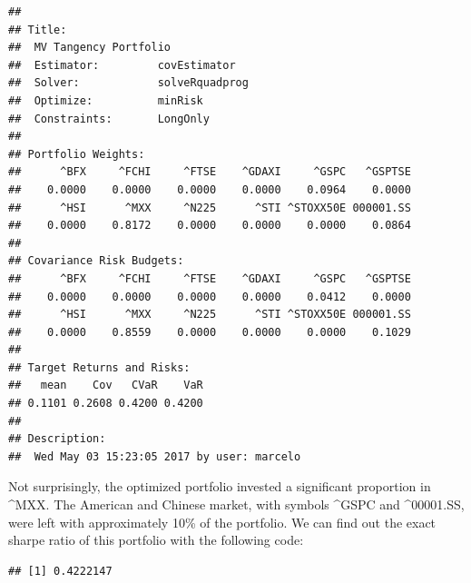 \documentclass[11pt,]{book}
\newenvironment{Shaded}{\begin{snugshade}}{\end{snugshade}}
\newcommand{\KeywordTok}[1]{\textcolor[rgb]{0.27,0.27,0.27}{\textbf{#1}}}
\newcommand{\DataTypeTok}[1]{\textcolor[rgb]{0.27,0.27,0.27}{#1}}
\newcommand{\StringTok}[1]{\textcolor[rgb]{0.5,0.5,0.5}{#1}}
\newcommand{\CommentTok}[1]{\textcolor[rgb]{0.56,0.35,0.01}{\textit{#1}}}
\newcommand{\OperatorTok}[1]{\textcolor[rgb]{0.81,0.36,0.00}{\textbf{#1}}}
\newcommand{\NormalTok}[1]{#1}
\begin{document}
\begin{verbatim}
## 
## Title:
##  MV Tangency Portfolio 
##  Estimator:         covEstimator 
##  Solver:            solveRquadprog 
##  Optimize:          minRisk 
##  Constraints:       LongOnly 
## 
## Portfolio Weights:
##      ^BFX     ^FCHI     ^FTSE    ^GDAXI     ^GSPC   ^GSPTSE 
##    0.0000    0.0000    0.0000    0.0000    0.0964    0.0000 
##      ^HSI      ^MXX     ^N225      ^STI ^STOXX50E 000001.SS 
##    0.0000    0.8172    0.0000    0.0000    0.0000    0.0864 
## 
## Covariance Risk Budgets:
##      ^BFX     ^FCHI     ^FTSE    ^GDAXI     ^GSPC   ^GSPTSE 
##    0.0000    0.0000    0.0000    0.0000    0.0412    0.0000 
##      ^HSI      ^MXX     ^N225      ^STI ^STOXX50E 000001.SS 
##    0.0000    0.8559    0.0000    0.0000    0.0000    0.1029 
## 
## Target Returns and Risks:
##   mean    Cov   CVaR    VaR 
## 0.1101 0.2608 0.4200 0.4200 
## 
## Description:
##  Wed May 03 15:23:05 2017 by user: marcelo
\end{verbatim}

Not surprisingly, the optimized portfolio invested a significant
proportion in \^{}MXX. The American and Chinese market, with symbols
\^{}GSPC and \^{}00001.SS, were left with approximately 10\% of the
portfolio. We can find out the exact sharpe ratio of this portfolio with
the following code:

\begin{Shaded}
\end{Shaded}

\begin{verbatim}
## [1] 0.4222147
\end{verbatim}
\end{document}
